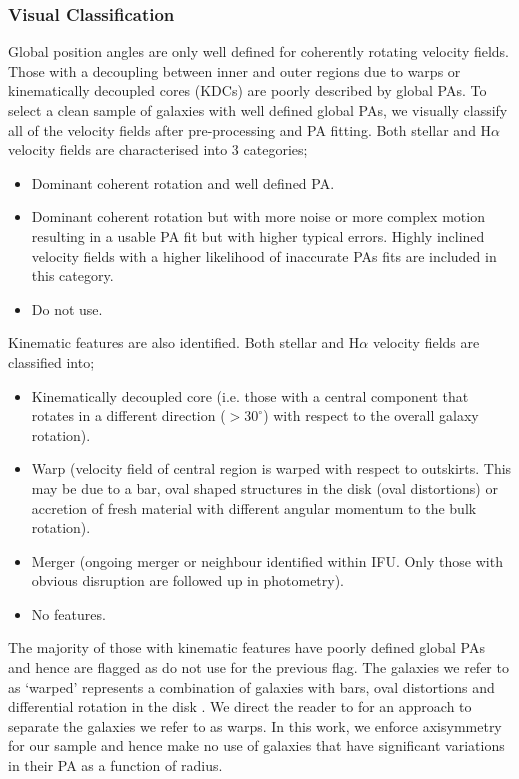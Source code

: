 \subsubsection{Visual Classification} 
Global position angles are only well defined for coherently rotating velocity fields. Those with a decoupling between inner and outer regions due to warps or kinematically decoupled cores (KDCs) are poorly described by global PAs. To select a clean sample of galaxies with well defined global PAs, we visually classify all of the velocity fields after pre-processing and PA fitting. Both stellar and H$\alpha$ velocity fields are characterised into 3 categories;
\begin{itemize}
    \item Dominant coherent rotation and well defined PA.
    \item Dominant coherent rotation but with more noise or more complex motion resulting in a usable PA fit but with higher typical errors. Highly inclined velocity fields with a higher likelihood of inaccurate PAs fits are included in this category. 
    \item Do not use.
\end{itemize}

Kinematic features are also identified. Both stellar and H$\alpha$ velocity fields are classified into;
\begin{itemize}
    \item Kinematically decoupled core (i.e. those with a central component that rotates in a different direction ($> 30^{\circ}$) with respect to the overall galaxy rotation).
    \item Warp (velocity field of central region is warped with respect to outskirts. This may be due to a bar, oval shaped structures in the disk (oval distortions) or accretion of fresh material with different angular momentum to the bulk rotation).
    \item Merger (ongoing merger or neighbour identified within IFU. Only those with obvious disruption are followed up in photometry).
    \item No features.
\end{itemize}
The majority of those with kinematic features have poorly defined global PAs and hence are flagged as do not use for the previous flag. The galaxies we refer to as `warped' represents a combination of galaxies with bars, oval distortions and differential rotation in the disk \citep[e.g.][]{barrera2014}. We direct the reader to \citet{stark2018} for an approach to separate the galaxies we refer to as warps. In this work, we enforce axisymmetry for our sample and hence make no use of galaxies that have significant variations in their PA as a function of radius.

